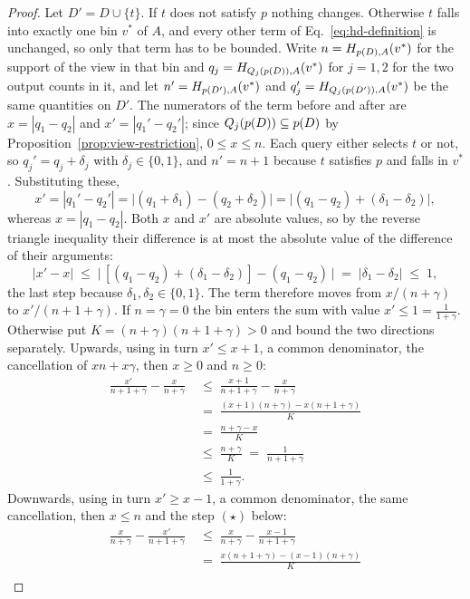 \begin{proof}
Let $D'=D\cup\{t\}$.
If $t$ does not satisfy $p$ nothing changes.
Otherwise $t$ falls into exactly one bin $v^*$ of $A$, and every other term of Eq.~\eqref{eq:hd-definition} is unchanged, so only that term has to be bounded.
Write $n=H_{p(D),A}(v^*)$ for the support of the view in that bin and $q_j=H_{Q_j(p(D)),A}(v^*)$ for $j=1,2$ for the two output counts in it, and let $n'=H_{p(D'),A}(v^*)$ and $q_j'=H_{Q_j(p(D')),A}(v^*)$ be the same quantities on $D'$.
The numerators of the term before and after are $x=|q_1-q_2|$ and $x'=|q_1'-q_2'|$; since $Q_j(p(D))\subseteq p(D)$ by Proposition~\ref{prop:view-restriction}, $0\le x\le n$.
Each query either selects $t$ or not, so $q_j'=q_j+\delta_j$ with $\delta_j\in\{0,1\}$, and $n'=n+1$ because $t$ satisfies $p$ and falls in $v^*$.
Substituting these,
\[
x'=|q_1'-q_2'|=\big|(q_1+\delta_1)-(q_2+\delta_2)\big|=\big|(q_1-q_2)+(\delta_1-\delta_2)\big| ,
\]
whereas $x=|q_1-q_2|$.
Both $x$ and $x'$ are absolute values, so by the reverse triangle inequality their difference is at most the absolute value of the difference of their arguments:
\[
|x'-x|\;\le\;\big|\,[(q_1-q_2)+(\delta_1-\delta_2)]-(q_1-q_2)\,\big|\;=\;|\delta_1-\delta_2|\;\le\;1 ,
\]
the last step because $\delta_1,\delta_2\in\{0,1\}$.
The term therefore moves from $x/(n+\gamma)$ to $x'/(n+1+\gamma)$.
If $n=\gamma=0$ the bin enters the sum with value $x'\le1=\frac{1}{1+\gamma}$.
Otherwise put $K=(n+\gamma)(n+1+\gamma)>0$ and bound the two directions separately.
Upwards, using in turn $x'\le x+1$, a common denominator, the cancellation of $xn+x\gamma$, then $x\ge0$ and $n\ge0$:
\begin{align*}
\frac{x'}{n+1+\gamma}-\frac{x}{n+\gamma}
&\;\le\;\frac{x+1}{n+1+\gamma}-\frac{x}{n+\gamma}\\[2pt]
&\;=\;\frac{(x+1)(n+\gamma)-x(n+1+\gamma)}{K}\\[2pt]
&\;=\;\frac{n+\gamma-x}{K}\\[2pt]
&\;\le\;\frac{n+\gamma}{K}\;=\;\frac{1}{n+1+\gamma}\\[2pt]
&\;\le\;\frac{1}{1+\gamma}.
\end{align*}
Downwards, using in turn $x'\ge x-1$, a common denominator, the same cancellation, then $x\le n$ and the step $(\star)$ below:
\begin{align*}
\frac{x}{n+\gamma}-\frac{x'}{n+1+\gamma}
&\;\le\;\frac{x}{n+\gamma}-\frac{x-1}{n+1+\gamma}\\[2pt]
&\;=\;\frac{x(n+1+\gamma)-(x-1)(n+\gamma)}{K}\\[2pt]

\end{align*}
\end{proof}
